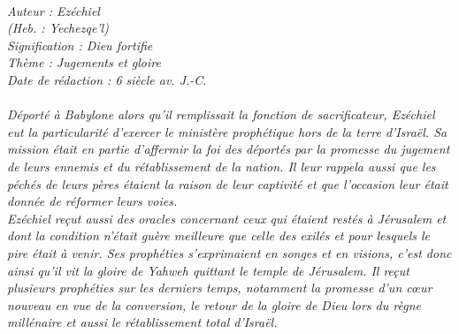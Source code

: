 \BFont
\noindent\hrulefill
{\footnotesize
\textit{
\bigskip
{\centering{}
\\Auteur : Ezéchiel
\\(Heb. : Yechezqe'l)
\\Signification : Dieu fortifie
\\Thème : Jugements et gloire
\\Date de rédaction : 6 siècle av. J.-C.\\}
}
\textit{
\\Déporté à Babylone alors qu'il remplissait la fonction de sacrificateur, Ezéchiel eut la particularité d'exercer le ministère prophétique hors de la terre d'Israël. Sa mission était en partie d'affermir la foi des déportés par la promesse du jugement de leurs ennemis et du rétablissement de la nation. Il leur rappela aussi que les péchés de leurs pères étaient la raison de leur captivité et que l'occasion leur était donnée de réformer leurs voies.
\\Ezéchiel reçut aussi des oracles concernant ceux qui étaient restés à Jérusalem et dont la condition n'était guère meilleure que celle des exilés et pour lesquels le pire était à venir. Ses prophéties s'exprimaient en songes et en visions, c'est donc ainsi qu'il vit la gloire de Yahweh quittant le temple de Jérusalem. Il reçut plusieurs prophéties sur les derniers temps, notamment la promesse d'un cœur nouveau en vue de la conversion, le retour de la gloire de Dieu lors du règne millénaire et aussi le rétablissement total d'Israël.\bigskip
}
}
\par\nobreak\noindent\hrulefill

